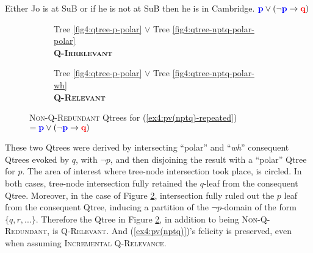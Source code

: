 \begin{exe}
	 {Either Jo is at SuB or if he is not at SuB then he is in Cambridge. $\textbf{\textcolor{blue}{p}} \vee (\neg \textbf{\textcolor{blue}{p}} \rightarrow \textbf{\textcolor{red}{q}})$}
\end{exe}

\begin{figure}[H]\setlength{\fboxsep}{2pt}
	\centering
	\begin{subfigure}[b]{.45\linewidth}
		\centering
		\caption[]{Tree \ref{fig4:qtree-p-polar} $\vee$ Tree \ref{fig4:qtree-nptq-polar-polar}\\
		\textbf{\textsc{Q-Irrelevant}}}\label{fig6:qtree-pv(nptq)-polar-polar}
	\end{subfigure}\hfill
	\begin{subfigure}[b]{.45\linewidth}
		\centering
		\scalebox{1}{
			\begin{forest}
				[CS [{\fbox{$\p$}}][{$\neg \p$} [\fbox{$\q$}][$\r$][...]]]
				\draw[color=black, dashed](.6,-2.3) circle (1.2);
			\end{forest}
		}
		\caption[]{Tree \ref{fig4:qtree-p-polar} $\vee$ Tree \ref{fig4:qtree-nptq-polar-wh}\\
		\textbf{\textsc{Q-Relevant}}}\label{fig6:qtree-pv(nptq)-polar-wh}
	\end{subfigure}\hfill
	\caption[]{\textsc{Non-Q-Redundant} Qtrees for (\ref{ex4:pv(nptq)-repeated}) $= \textbf{\textcolor{blue}{p}} \vee (\neg \textbf{\textcolor{blue}{p}} \rightarrow \textbf{\textcolor{red}{q}})$}\label{fig6:qtrees-pv(nptq)}
\end{figure}

These two Qtrees were derived by intersecting ``polar'' and ``\textit{wh}'' consequent Qtrees evoked by $q$, with $\neg p$, and then disjoining the result with a ``polar'' Qtree for $p$. The area of interest where tree-node intersection took place, is circled. In both cases, tree-node intersection fully retained the $q$-leaf from the consequent Qtree. Moreover, in the case of Figure \ref{fig6:qtree-pv(nptq)-polar-wh}, intersection fully ruled out the $p$ leaf from the consequent Qtree, inducing a partition of the $\neg p$-domain of the form $\lbrace q, r, ...\rbrace$. Therefore the Qtree in Figure \ref{fig6:qtree-pv(nptq)-polar-wh}, in addition to being \textsc{Non-Q-Redundant}, is \textsc{Q-Relevant}. And (\ref{ex4:pv(nptq)})'s felicity is preserved, even when assuming \textsc{Incremental Q-Relevance}.\\


